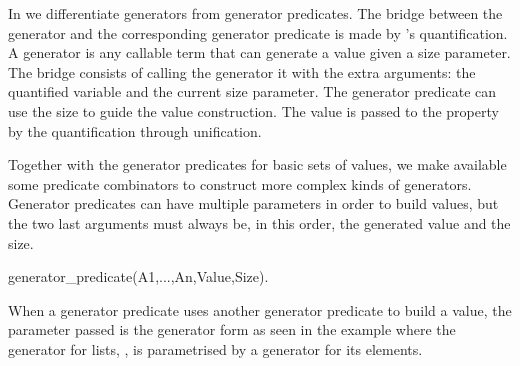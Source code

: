 In \plqc{} we differentiate generators from generator predicates.
%
The bridge between the generator and the corresponding generator
predicate is made by \plqc{}'s quantification.
%
A generator is any callable term that can generate a value given a
size parameter.
%
The bridge consists of calling the generator it with the extra
arguments: the quantified variable and the current size parameter.
%
The generator predicate can use the size to guide the value
construction.
%
The value is passed to the property by the \plqc{} quantification
through unification.



Together with the generator predicates for basic sets of values, we make
available some predicate combinators to construct more complex kinds of
generators.
%
Generator predicates can have multiple parameters in order to build
values, but the two last arguments must always be, in this order, the
generated value and the size.
%
\begin{yapcode}
 generator_predicate(A1,...,An,Value,Size).
\end{yapcode}
%
When a generator predicate uses another generator predicate to build a
value, the parameter passed is the generator form as seen in the example
where the generator for lists, , is parametrised by a
generator for its elements.
%








